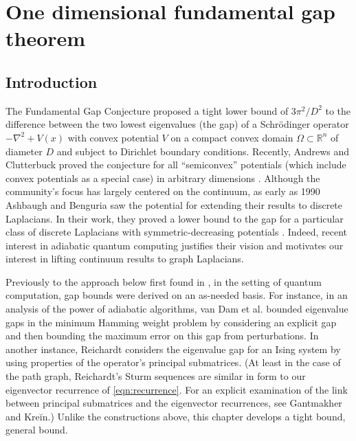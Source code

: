 
\newtheorem{fact}{Fact}

\newcommand{\size}[1]{\left\lvert #1 \right\rvert}
\newcommand{\graph}[2]{\mathbb{#1}_{#2}}
\newcommand{\intset}[2]{\left \llbracket #1 , #2 \right \rrbracket}

\chapter{One dimensional fundamental gap theorem}\label{chap:fundamental_gap}

\section{Introduction}
  The Fundamental Gap Conjecture proposed a tight lower bound of $3\pi^2/D^2$ to the difference between the two lowest eigenvalues (the gap) of a Schr\"{o}dinger operator $-\nabla^2 + V(x)$ with convex potential $V$ on a compact convex domain $\Omega \subset \mathbb{R}^n$ of diameter $D$ and subject to Dirichlet boundary conditions. Recently, Andrews and Clutterbuck proved the conjecture for all ``semiconvex'' potentials (which include convex potentials as a special case) in arbitrary dimensions \cite{Andrews2011}. Although the community's focus has largely centered on the continuum\cite{Andrews2011, Lavine1994, ashbaugh1989optimal, Yu1986}, as early as 1990 Ashbaugh and Benguria saw the potential for extending their results to discrete Laplacians. In their work, they proved a lower bound to the gap for a particular class of discrete Laplacians with symmetric-decreasing potentials \cite{ashbaugh1990some}. Indeed, recent interest in adiabatic quantum computing justifies their vision and motivates our interest in lifting continuum results to graph Laplacians\cite{Farhi_science, FGG02}.

  Previously to the approach below first found in \cite{Jarret2014c}, in the setting of quantum computation, gap bounds were derived on an as-needed basis. For instance, in an analysis of the power of adiabatic algorithms, van Dam et al. bounded eigenvalue gaps in the minimum Hamming weight problem by considering an explicit gap and then bounding the maximum error on this gap from perturbations\cite{DMV01}. In another instance, Reichardt considers the eigenvalue gap for an Ising system by using properties of the operator's principal submatrices\cite{R04}. (At least in the case of the path graph, Reichardt's Sturm sequences are similar in form to our eigenvector recurrence of \cref{eqn:recurrence}. For an explicit examination of the link between principal submatrices and the eigenvector recurrences, see Gantmakher and Kre\u{i}n\cite{gantmakher2002oscillation}.) Unlike the constructions above, this chapter develops a tight bound, general bound. 
  
